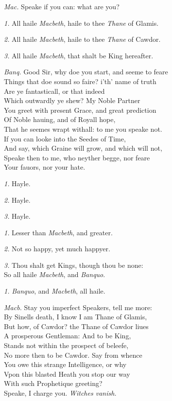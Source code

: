 \documentclass[12pt]{sides}
\newcommand{\dia}[1]{\hskip 10pt\textit{#1}\hskip 6pt}
\begin{document}
\begin{multicols}{2}
            \dia{Mac.} Speake if you can: what are you?
            
            \dia{1.} All haile \textit{Macbeth}, haile to thee \textit{Thane} of Glamis.
            
            \dia{2.} All haile \textit{Macbeth}, haile to thee \textit{Thane} of Cawdor.

            \dia{3.} All haile \textit{Macbeth}, that shalt be King hereafter.

            \dia{Banq.} Good Sir, why doe you start, and seeme to feare \\ Things that doe sound so faire? i'th' name of truth \\ Are ye fantasticall, or that indeed \\ Which outwardly ye shew? My Noble Partner \\ You greet with present Grace, and great prediction \\ Of Noble hauing, and of Royall hope, \\ That he seemes wrapt withall: to me you speake not. \\ If you can looke into the Seedes of Time, \\ And say, which Graine will grow, and which will not, \\ Speake then to me, who neyther begge, nor feare \\ Your fauors, nor your hate.

            \dia{1.} Hayle.
            
            \dia{2.} Hayle.
            
            \dia{3.} Hayle.

            \dia{1.} Lesser than \textit{Macbeth}, and greater.

            \dia{2.} Not so happy, yet much happyer.

            \dia{3.} Thou shalt get Kings, though thou be none: \\ So all haile \textit{Macbeth}, and \textit{Banquo}.

            \dia{1.} \textit{Banquo}, and \textit{Macbeth}, all haile.

            \dia{Macb.} Stay you imperfect Speakers, tell me more: \\ By Sinells death, I know I am Thane of Glamis, \\ But how, of Cawdor? the Thane of Cawdor liues \\ A prosperous Gentleman: And to be King, \\ Stands not within the prospect of beleefe, \\ No more then to be Cawdor. Say from whence \\ You owe this strange Intelligence, or why \\ Vpon this blasted Heath you stop our way \\ With such Prophetique greeting? \\ Speake, I charge you. \hfill \textit{Witches vanish.}


\end{multicols}
\end{document}
